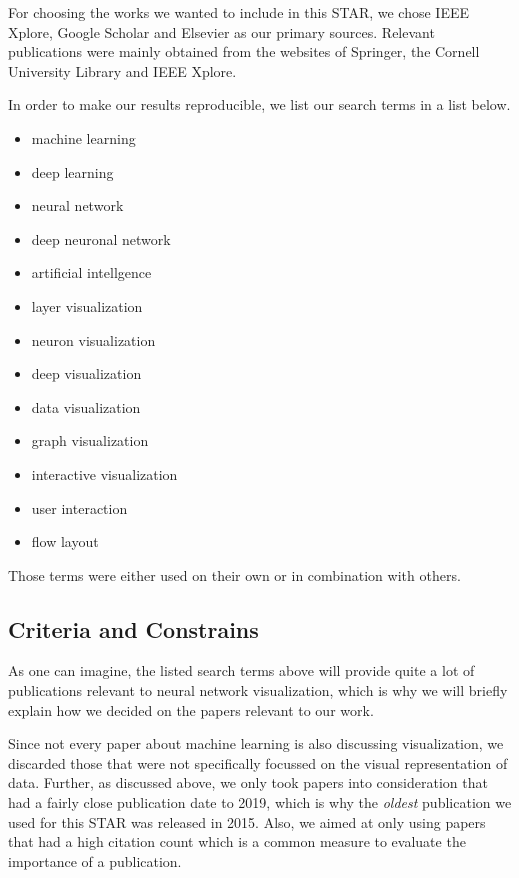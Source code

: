 \documentclass{acmsiggraph}               %
\begin{document}
For choosing the works we wanted to include in this STAR, we chose IEEE Xplore, Google Scholar and Elsevier as our primary sources. Relevant publications were mainly obtained from the websites of Springer, the Cornell University Library and IEEE Xplore.

In order to make our results reproducible, we list our search terms in a list below.

\begin{multicols}{2}
\begin{itemize}
\item machine learning
\item deep learning
\item neural network
\item deep neuronal network
\item artificial intellgence
\item layer visualization
\item neuron visualization
\item deep visualization
\item data visualization
\item graph visualization
\item interactive visualization
\item user interaction
\item flow layout
\end{itemize}
\end{multicols}

Those terms were either used on their own or in combination with others.

\subsection{Criteria and Constrains}
As one can imagine, the listed search terms above will provide quite a lot of publications relevant to neural network visualization, which is why we will briefly explain how we decided on the papers relevant to our work.

Since not every paper about machine learning is also discussing visualization, we discarded those that were not specifically focussed on the visual representation of data. Further, as discussed above, we only took papers into consideration that had a fairly close publication date to 2019, which is why the \textit{oldest} publication we used for this STAR was released in 2015. Also, we aimed at only using papers that had a high citation count which is a common measure to evaluate the importance of a publication.
\end{document}
